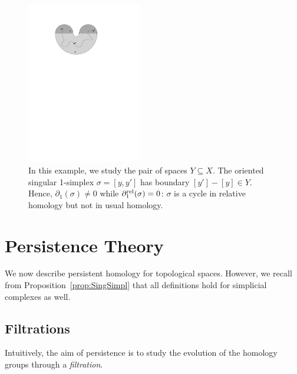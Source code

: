 \begin{figure}\centering
\includegraphics[width=5cm]{figures/CounterExampleRelHom}
\caption[Relative cycle]{\label{fig:RelHom} In this example, we study the pair of spaces $Y\subseteq X$. The oriented singular 1-simplex $\sigma=[y,y']$
has boundary $[y']-[y]\in Y$. Hence, $\partial_1(\sigma)\neq 0$ while $\partial^{\rm rel}_1(\sigma)=0$:
$\sigma$ is a cycle in relative homology but not in usual homology.}
\end{figure}















\section{Persistence Theory}
\label{sec:persistence}

We now describe persistent homology for topological spaces.
However, we recall from Proposition~\ref{prop:SingSimpl} that all definitions
hold for simplicial complexes as well.

\subsection{Filtrations}\label{sec:filtrations}

Intuitively, the aim of persistence is to study the evolution of the homology groups through a %
{\em filtration}. 

